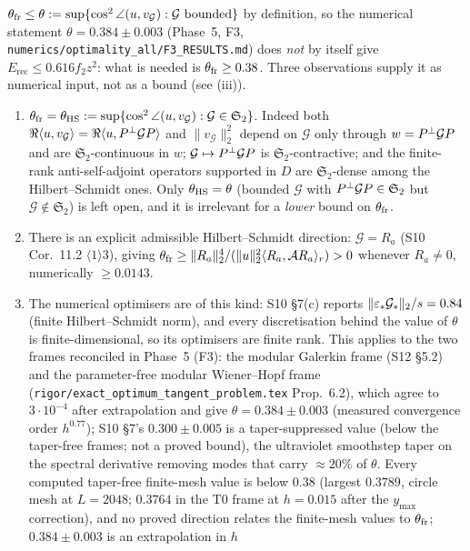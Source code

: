\documentclass[11pt]{article}
\newcommand{\Stwo}{\mathfrak S_2}\newcommand{\Sone}{\mathfrak S_1}
\newcommand{\norm}[1]{\lVert #1\rVert}\newcommand{\abs}[1]{\lvert #1\rvert}
\newcommand{\ip}[2]{\langle #1,#2\rangle}\newcommand{\one}{\mathbf 1}
\newcommand{\Erec}{E_{\mathrm{rec}}}\newcommand{\Gs}{\mathcal G}
\begin{document}
\begin{remark}\label{rem:thetafr}
$\theta_{\rm fr}\le\theta:=\sup\{\cos^2\angle(u,v_\Gs):\Gs\ \text{bounded}\}$ by definition, so
the numerical statement $\theta=0.384\pm0.003$ (Phase~5, F3,
\texttt{numerics/optimality\_all/F3\_RESULTS.md}) does \emph{not} by itself give
$\Erec\le0.616f_2z^2$: what is needed is $\theta_{\rm fr}\ge0.38$.  Three observations supply it as numerical input, not as a bound (see (iii)).
\begin{enumerate}[label=(\roman*),leftmargin=2.2em,itemsep=1pt]
\item $\theta_{\rm fr}=\theta_{\rm HS}:=\sup\{\cos^2\angle(u,v_\Gs):\Gs\in\Stwo\}$.  Indeed both
 $\Re\ip u{v_\Gs}=\Re\ip u{\Pperp\Gs P}$ and $\norm{v_\Gs}_2^2$ depend on $\Gs$ only through
 $w=\Pperp\Gs P$ and are $\Stwo$-continuous in $w$; $\Gs\mapsto\Pperp\Gs P$ is
 $\Stwo$-contractive; and the finite-rank anti-self-adjoint operators supported in $D$ are
 $\Stwo$-dense among the Hilbert--Schmidt ones.  Only $\theta_{\rm HS}=\theta$ (bounded $\Gs$
 with $\Pperp\Gs P\in\Stwo$ but $\Gs\notin\Stwo$) is left open, and it is irrelevant for a
 \emph{lower} bound on $\theta_{\rm fr}$.
\item There is an explicit admissible Hilbert--Schmidt direction: $\Gs=R_a$ (S10 Cor.~11.2
 $\langle1\rangle3$), giving
 $\theta_{\rm fr}\ge\norm{R_a}_2^4/(\norm u_2^2\ip{R_a}{\mathcal AR_a}_r)>0$ whenever
 $R_a\ne0$, numerically $\ge0.0143$.
\item The numerical optimisers are of this kind: S10 \S7(c) reports
 $\norm{\eps_*\Gs_*}_2/s=0.84$ (finite Hilbert--Schmidt norm), and every discretisation behind
 the value of $\theta$ is finite-dimensional, so its optimisers are finite rank.  This applies
 to the two frames reconciled in Phase~5 (F3): the modular Galerkin frame (S12 \S5.2) and the
 parameter-free modular Wiener--Hopf frame (\texttt{rigor/exact\_optimum\_tangent\_problem.tex}
 Prop.~6.2), which agree to $3\cdot10^{-4}$ after extrapolation and give
 $\theta=0.384\pm0.003$ (measured convergence order $h^{0.77}$); S10 \S7's $0.300\pm0.005$ is a
 taper-suppressed value (below the taper-free frames; not a proved bound), the ultraviolet smoothstep taper on the spectral
 derivative removing modes that carry $\approx20\%$ of $\theta$.  Every computed taper-free finite-mesh value is below $0.38$ (largest $0.3789$, circle mesh at $L=2048$; $0.3764$ in the T0 frame at
 $h=0.015$ after the $y_{\max}$ correction), and no proved direction relates the finite-mesh values to $\theta_{\rm fr}$; $0.384\pm0.003$ is an extrapolation in $h$

\end{enumerate}
\end{remark}
\end{document}
